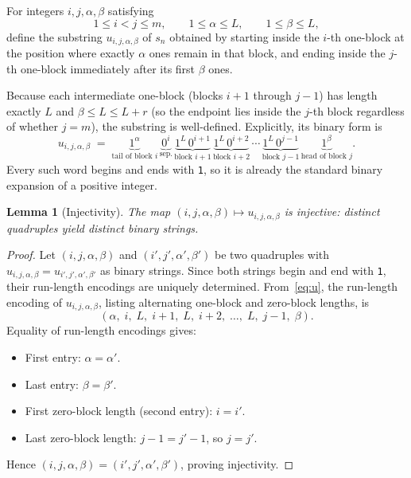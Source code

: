 \documentclass[12pt,a4paper]{article}
\theoremstyle{plain}
\newtheorem{lemma}[theorem]{Lemma}
\theoremstyle{definition}
\theoremstyle{remark}
\begin{document}
For integers $i, j, \alpha, \beta$ satisfying
\[
  1 \le i < j \le m, \qquad 1 \le \alpha \le L, \qquad 1 \le \beta \le L,
\]
define the substring $u_{i,j,\alpha,\beta}$ of $s_n$ obtained by starting
inside the $i$-th one-block at the position where exactly $\alpha$ ones
remain in that block, and ending inside the $j$-th one-block immediately
after its first $\beta$ ones.

Because each intermediate one-block (blocks $i+1$ through $j-1$) has
length exactly $L$ and $\beta \le L \le L+r$ (so the endpoint lies inside
the $j$-th block regardless of whether $j = m$), the substring is
well-defined.  Explicitly, its binary form is
\begin{equation}\label{eq:u}
  u_{i,j,\alpha,\beta}
  \;=\;
  \underbrace{1^{\alpha}}_{\text{tail of block }i}\,
  \underbrace{0^{i}}_{\text{sep.}}\,
  \underbrace{1^{L}\,0^{i+1}}_{\text{block }i+1}\,
  \underbrace{1^{L}\,0^{i+2}}_{\text{block }i+2}\,
  \cdots\,
  \underbrace{1^{L}\,0^{j-1}}_{\text{block }j-1}\,
  \underbrace{1^{\beta}}_{\text{head of block }j}.
\end{equation}
Every such word begins and ends with \texttt{1}, so it is already the
standard binary expansion of a positive integer.

\begin{lemma}[Injectivity]\label{lem:inject}
  The map $(i, j, \alpha, \beta) \mapsto u_{i,j,\alpha,\beta}$ is
  injective: distinct quadruples yield distinct binary strings.
\end{lemma}

\begin{proof}
  Let $(i, j, \alpha, \beta)$ and $(i', j', \alpha', \beta')$ be two
  quadruples with $u_{i,j,\alpha,\beta} = u_{i',j',\alpha',\beta'}$ as
  binary strings.  Since both strings begin and end with \texttt{1}, their
  run-length encodings are uniquely determined.  From~\eqref{eq:u}, the
  run-length encoding of $u_{i,j,\alpha,\beta}$, listing alternating
  one-block and zero-block lengths, is
  \[
    (\alpha,\; i,\; L,\; i+1,\; L,\; i+2,\; \ldots,\; L,\; j-1,\; \beta).
  \]
  Equality of run-length encodings gives:
  \begin{itemize}
    \item First entry: $\alpha = \alpha'$.
    \item Last entry: $\beta = \beta'$.
    \item First zero-block length (second entry): $i = i'$.
    \item Last zero-block length: $j - 1 = j' - 1$, so $j = j'$.
  \end{itemize}
  Hence $(i, j, \alpha, \beta) = (i', j', \alpha', \beta')$, proving
  injectivity.
\end{proof}
\end{document}
